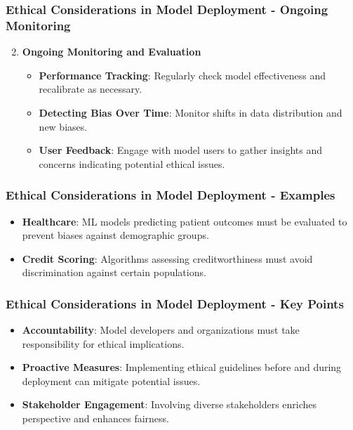 \documentclass[aspectratio=169]{beamer}
\begin{document}
\begin{frame}[fragile]
    \frametitle{Ethical Considerations in Model Deployment - Ongoing Monitoring}
    \begin{enumerate}
        \setcounter{enumi}{1}
        \item \textbf{Ongoing Monitoring and Evaluation}
        \begin{itemize}
            \item \textbf{Performance Tracking}: Regularly check model effectiveness and recalibrate as necessary.
            \item \textbf{Detecting Bias Over Time}: Monitor shifts in data distribution and new biases.
            \item \textbf{User Feedback}: Engage with model users to gather insights and concerns indicating potential ethical issues.
        \end{itemize}
    \end{enumerate}
\end{frame}

\begin{frame}[fragile]
    \frametitle{Ethical Considerations in Model Deployment - Examples}
    \begin{itemize}
        \item \textbf{Healthcare}: ML models predicting patient outcomes must be evaluated to prevent biases against demographic groups.
        \item \textbf{Credit Scoring}: Algorithms assessing creditworthiness must avoid discrimination against certain populations.
    \end{itemize}
\end{frame}

\begin{frame}[fragile]
    \frametitle{Ethical Considerations in Model Deployment - Key Points}
    \begin{itemize}
        \item \textbf{Accountability}: Model developers and organizations must take responsibility for ethical implications.
        \item \textbf{Proactive Measures}: Implementing ethical guidelines before and during deployment can mitigate potential issues.
        \item \textbf{Stakeholder Engagement}: Involving diverse stakeholders enriches perspective and enhances fairness.
    \end{itemize}
\end{frame}
\end{document}
